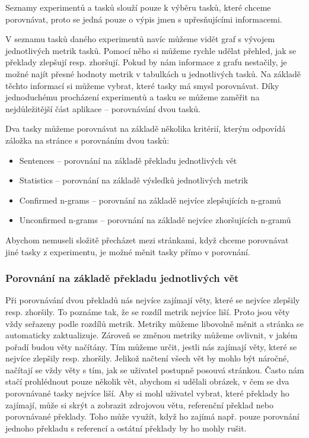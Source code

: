Seznamy experimentů a tasků slouží pouze k výběru tasků,
  které chceme porovnávat,
  proto se jedná pouze o výpis jmen s upřesňujícími informacemi.

V seznamu tasků daného experimentů navíc můžeme vidět graf s vývojem jednotlivých metrik tasků.
Pomocí něho si můžeme rychle udělat přehled,
  jak se překlady zlepšují resp. zhoršují.
Pokud by nám informace z grafu nestačily,
  je možné najít přesné hodnoty metrik v tabulkách u jednotlivých tasků.
Na základě těchto informací si můžeme vybrat,
  které tasky má smysl porovnávat.
Díky jednoduchému procházení experimentů a tasku se můžeme zaměřit na nejdůležitější část aplikace
  -- porovnávání dvou tasků.

Dva tasky můžeme porovnávat na základě několika kritérií,
  kterým odpovídá záložka na stránce s porovnáním dvou tasků:
\begin{itemize}
  \item Sentences -- porovnání na základě překladu jednotlivých vět
  \item Statistics -- porovnání na základě výsledků jednotlivých metrik
  \item Confirmed \mbox{n-grams} -- porovnání na základě nejvíce zlepšujících \mbox{n-gramů}
  \item Unconfirmed \mbox{n-grams} -- porovnání na základě nejvíce zhoršujících \mbox{n-gramů}
\end{itemize}

Abychom nemuseli složitě přecházet mezi stránkami,
  když chceme porovnávat jiné tasky z experimentu,
  je možné měnit tasky přímo v porovnání.


\subsubsection{Porovnání na základě překladu jednotlivých vět}
Při porovnávání dvou překladů nás nejvíce zajímají věty,
  které se nejvíce zlepšily resp. zhoršily.
To poznáme tak, že se rozdíl metrik nejvíce liší. 
Proto jsou věty vždy seřazeny podle rozdílů metrik.
Metriky můžeme libovolně měnit a stránka se automaticky zaktualizuje.
Zároveň se změnou metriky můžeme ovlivnit,
  v jakém pořadí budou věty načítány.
Tím můžeme určit,
  jestli nás zajímají věty,
  které se nejvíce zlepšily resp. zhoršily.
Jelikož načtení všech vět by mohlo být náročné,
  načítají se vždy věty s tím,
  jak se uživatel postupně posouvá stránkou.
Často nám stačí prohlédnout pouze několik vět,
  abychom si udělali obrázek,
  v čem se dva porovnávané tasky nejvíce liší.
Aby si mohl uživatel vybrat,
  které překlady ho zajímají,
  může si skrýt a zobrazit zdrojovou větu, referenční překlad nebo porovnávané překlady.
Toho může využít, když ho zajímá např. pouze porovnání jednoho překladu s referencí a
  ostátní překlady by ho mohly rušit.

